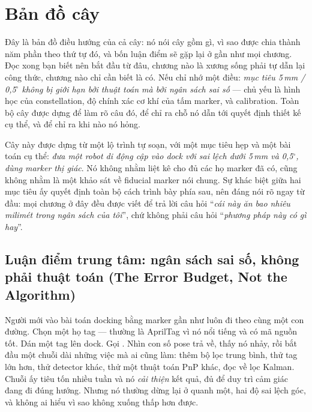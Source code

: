 \documentclass[marker.tex]{subfiles}
\begin{document}
\chapter*{Bản đồ cây}

\begin{tomtat}
Đây là bản đồ điều hướng của cả cây: nó nói cây gồm gì, vì sao được chia thành năm phần theo thứ tự đó, và bốn luận điểm sẽ gặp lại ở gần như mọi chương. Đọc xong bạn biết nên bắt đầu từ đâu, chương nào là xương sống phải tự dẫn lại công thức, chương nào chỉ cần biết là có. Nếu chỉ nhớ một điều: \emph{mục tiêu 5\,mm / 0,5\(^\circ\) không bị giới hạn bởi thuật toán mà bởi ngân sách sai số} --- chủ yếu là hình học của constellation, độ chính xác cơ khí của tấm marker, và calibration. Toàn bộ cây được dựng để làm rõ câu đó, để chỉ ra chỗ nó dẫn tới quyết định thiết kế cụ thể, và để chỉ ra khi nào nó hỏng.
\end{tomtat}

Cây này được dựng từ một lộ trình tự soạn, với một mục tiêu hẹp và một bài toán cụ thể: \emph{đưa một robot di động cập vào dock với sai lệch dưới 5\,mm và 0,5\(^\circ\), dùng marker thị giác}. Nó không nhằm liệt kê cho đủ các họ marker đã có, cũng không nhằm là một khảo sát về fiducial marker nói chung. Sự khác biệt giữa hai mục tiêu ấy quyết định toàn bộ cách trình bày phía sau, nên đáng nói rõ ngay từ đầu: mọi chương ở đây đều được viết để trả lời câu hỏi ``\emph{cái này ăn bao nhiêu milimét trong ngân sách của tôi}'', chứ không phải câu hỏi ``\emph{phương pháp này có gì hay}''.

\section*{Luận điểm trung tâm: ngân sách sai số, không phải thuật toán (The Error Budget, Not the Algorithm)}

Người mới vào bài toán docking bằng marker gần như luôn đi theo cùng một con đường. Chọn một họ tag --- thường là AprilTag vì nó nổi tiếng và có mã nguồn tốt. Dán một tag lên dock. Gọi . Nhìn con số pose trả về, thấy nó nhảy, rồi bắt đầu một chuỗi dài những việc mà ai cũng làm: thêm bộ lọc trung bình, thử tag lớn hơn, thử detector khác, thử một thuật toán PnP khác, đọc về lọc Kalman. Chuỗi ấy tiêu tốn nhiều tuần và nó \emph{cải thiện} kết quả, đủ để duy trì cảm giác đang đi đúng hướng. Nhưng nó thường dừng lại ở quanh một, hai độ sai lệch góc, và không ai hiểu vì sao không xuống thấp hơn được.
\end{document}

